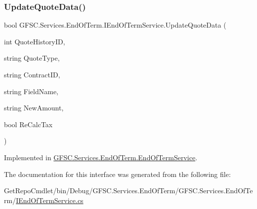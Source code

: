 \subsubsection{\texorpdfstring{Update\+Quote\+Data()}{UpdateQuoteData()}}
{\footnotesize\ttfamily bool G\+F\+S\+C.\+Services.\+End\+Of\+Term.\+I\+End\+Of\+Term\+Service.\+Update\+Quote\+Data (\begin{DoxyParamCaption}\item[{int}]{Quote\+History\+ID,  }\item[{string}]{Quote\+Type,  }\item[{string}]{Contract\+ID,  }\item[{string}]{Field\+Name,  }\item[{string}]{New\+Amount,  }\item[{bool}]{Re\+Calc\+Tax }\end{DoxyParamCaption})}



Implemented in \mbox{\hyperlink{class_g_f_s_c_1_1_services_1_1_end_of_term_1_1_end_of_term_service_aac836613e660d4d80c5467852fa053ec}{G\+F\+S\+C.\+Services.\+End\+Of\+Term.\+End\+Of\+Term\+Service}}.



The documentation for this interface was generated from the following file\+:\begin{DoxyCompactItemize}
\item 
Get\+Repo\+Cmdlet/bin/\+Debug/\+G\+F\+S\+C.\+Services.\+End\+Of\+Term/\+G\+F\+S\+C.\+Services.\+End\+Of\+Term/\mbox{\hyperlink{_i_end_of_term_service_8cs}{I\+End\+Of\+Term\+Service.\+cs}}\end{DoxyCompactItemize}
